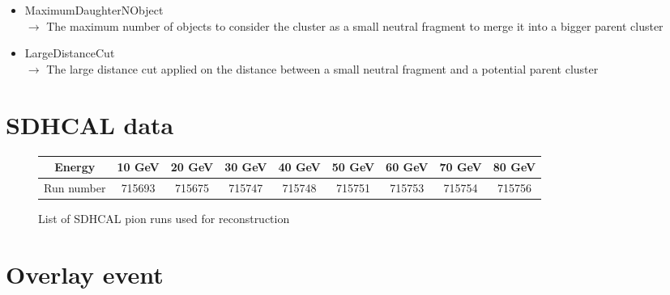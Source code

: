 \documentclass[cits]{JINST}
\begin{document}
\begin{itemize}
  \item MaximumDaughterNObject \\
  $\rightarrow$ The maximum number of objects to consider the cluster as a small neutral fragment to merge it into a bigger parent cluster
  \item LargeDistanceCut \\
  $\rightarrow$ The large distance cut applied on the distance between a small neutral fragment and a potential parent cluster
\end{itemize}



\newpage
\section{SDHCAL data}

\begin{center}
  \begin{figure}[!h]
    \begin{tabular}{| c | c | c | c | c | c | c | c | c |}
      \hline
      Energy & 10 GeV & 20 GeV & 30 GeV & 40 GeV & 50 GeV & 60 GeV & 70 GeV & 80 GeV \\ \hline
      Run number & 715693 & 715675 & 715747 & 715748 & 715751 & 715753 & 715754 & 715756 \\ \hline
    \end{tabular}
    \caption{\label{SDHCAL_RUN_LIST} List of SDHCAL pion runs used for reconstruction}
  \end{figure}
\end{center}

\section{Overlay event}
\end{document}
